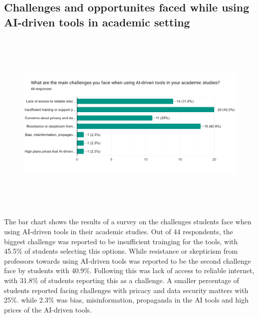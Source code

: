 \subsection{Challenges and opportunites faced while using AI-driven tools in academic setting}

\begin{figure}[H]
	\centering
	\includegraphics[width=17cm, height=9cm]{./chap4/figures/chall}
\end{figure}

The bar chart shows the results of a survey on the challenges students
face when using AI-driven tools in their academic studies. Out of 44 respondents,
the biggest challenge was reported to be insufficient trainging for the
tools, with 45.5\% of students selecting this options. While resistance or skepticism
from professors towards using AI-driven tools was reported to be the second challenge
face by students with 40.9\%.
Following this was lack of access to reliable internet, with 31.8\% of students
reporting this as a challenge.
A smaller percentage of students reported facing challenges with pricacy and data security matters
with 25\%. while 2.3\% was bias, misinformation, propaganda in the AI tools and high prices of the AI-driven tools.

